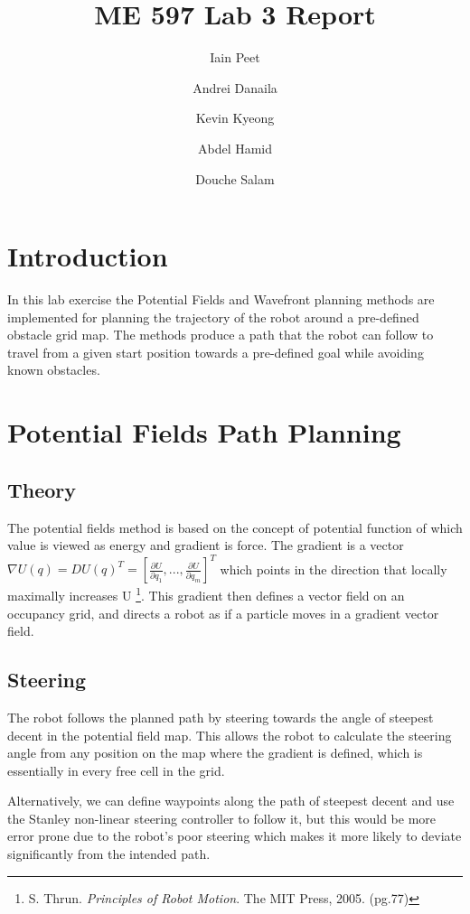 \documentclass[11pt]{article} %
\title{ME 597 Lab 3 Report}
\author{Iain Peet \and Andrei Danaila \and Kevin Kyeong \and Abdel Hamid \and Douche Salam}
\begin{document}
\maketitle

\clearpage

\section{Introduction}
In this lab exercise the Potential Fields and Wavefront planning methods are implemented for planning the trajectory of the robot around a pre-defined obstacle grid map. The methods produce a path that the robot can follow to travel from a given start position towards a pre-defined goal while avoiding known obstacles.

\section{Potential Fields Path Planning}
\subsection{Theory}
The potential fields method is based on the concept of potential function of which value is viewed as energy and gradient is force.  The gradient is a vector $\nabla U(q) = DU(q)^T = [\frac{\partial U}{\partial q_1}, . . . , \frac{\partial U}{\partial q_m}]^T$ which points in the direction that locally maximally increases U \footnote{S. Thrun. \emph{Principles of Robot Motion}. The MIT Press, 2005. (pg.77)}.  This gradient then defines a vector field on an occupancy grid, and directs a robot as if a particle moves in a gradient vector field.

\subsection{Steering}
The robot follows the planned path by steering towards the angle of steepest decent in the potential field map. This allows the robot to calculate the steering angle from any position on the map where the gradient is defined, which is essentially in every free cell in the grid.

Alternatively, we can define waypoints along the path of steepest decent and use the Stanley non-linear steering controller to follow it, but this would be more error prone due to the robot's poor steering which makes it more likely to deviate significantly from the intended path.
\end{document}
